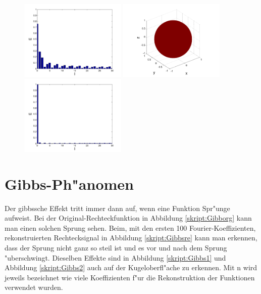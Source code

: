 \begin{refsection}
\begin{figure}
\includegraphics[width=0.45\textwidth]{kugel/Dkonstant/Kugel3_2.pdf}
\includegraphics[width=0.45\textwidth]{kugel/Dkonstant/Kugel4_1.pdf}
\includegraphics[width=0.45\textwidth]{kugel/Dkonstant/Kugel4_2.pdf}
\label{skript:Dirac1}%
\end{figure}

\section{Gibbs-Ph"anomen}
Der gibbssche Effekt tritt immer dann auf, wenn eine Funktion 
Spr"unge aufweist. 
Bei der Original-Rechteckfunktion in Abbildung \ref{skript:Gibborg} 
kann man einen solchen Sprung sehen. Beim, mit den ersten 100
Fourier-Koeffizienten, rekonstruierten Rechtecksignal in 
Abbildung \ref{skript:Gibbsre} kann man erkennen, 
dass der Sprung nicht ganz so steil ist und es vor und nach dem 
Sprung "uberschwingt. 
Dieselben Effekte sind in Abbildung \ref{skript:Gibbs1} und 
Abbildung \ref{skript:Gibbs2} auch auf der Kugeloberfl"ache zu 
erkennen.
Mit n wird jeweils bezeichnet wie viele Koeffizienten f"ur die 
Rekonstruktion der Funktionen verwendet wurden.


\end{refsection}
